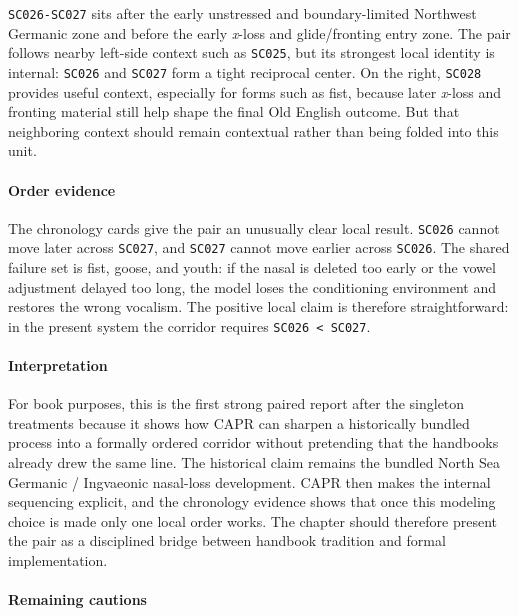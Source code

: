 \documentclass[
  british,
  a4paper,
]{article}
\begin{document}
\texttt{SC026-SC027} sits after the early unstressed and
boundary-limited Northwest Germanic zone and before the early
\emph{x}-loss and glide/fronting entry zone. The pair follows nearby
left-side context such as \texttt{SC025}, but its strongest local
identity is internal: \texttt{SC026} and \texttt{SC027} form a tight
reciprocal center. On the right, \texttt{SC028} provides useful context,
especially for forms such as fist, because later \emph{x}-loss and
fronting material still help shape the final Old English outcome. But
that neighboring context should remain contextual rather than being
folded into this unit.

\paragraph{Order evidence}\label{order-evidence-19}

The chronology cards give the pair an unusually clear local result.
\texttt{SC026} cannot move later across \texttt{SC027}, and
\texttt{SC027} cannot move earlier across \texttt{SC026}. The shared
failure set is fist, goose, and youth: if the nasal is deleted too early
or the vowel adjustment delayed too long, the model loses the
conditioning environment and restores the wrong vocalism. The positive
local claim is therefore straightforward: in the present system the
corridor requires \texttt{SC026\ \textless{}\ SC027}.

\paragraph{Interpretation}\label{interpretation-19}

For book purposes, this is the first strong paired report after the
singleton treatments because it shows how CAPR can sharpen a
historically bundled process into a formally ordered corridor without
pretending that the handbooks already drew the same line. The historical
claim remains the bundled North Sea Germanic / Ingvaeonic nasal-loss
development. CAPR then makes the internal sequencing explicit, and the
chronology evidence shows that once this modeling choice is made only
one local order works. The chapter should therefore present the pair as
a disciplined bridge between handbook tradition and formal
implementation.

\paragraph{Remaining cautions}\label{remaining-cautions-19}
\end{document}
